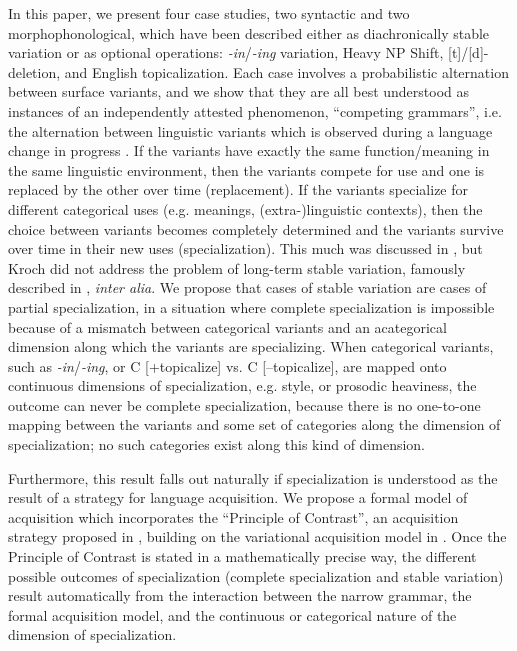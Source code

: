\documentclass[a4paper,aps,prl,12pt,tightenlines,superscriptaddress]{revtex4}
\begin{document}
In this paper, we present four case studies, two syntactic and two morphophonological, which have been described either as diachronically stable variation or as optional operations: \textsl{-in}/\textsl{-ing} variation, Heavy NP Shift, [t]/[d]-deletion, and English topicalization.
Each case involves a probabilistic alternation between surface variants, and we show that they are all best understood as instances of an independently attested phenomenon, ``competing grammars'', i.e. the alternation between linguistic variants which is observed during a language change in progress \citep[][]{kroch1989}.
If the variants have exactly the same function/meaning in the same linguistic environment, then the variants compete for use and one is replaced by the other over time (replacement). 
If the variants specialize for different categorical uses (e.g. meanings, (extra-)linguistic  contexts), then the choice between variants becomes completely determined and the variants survive over time in their new uses (specialization). 
This much was discussed in \citet{kroch1994}, but Kroch did not address the problem of long-term stable variation, famously described in \citet{labov1989}, \textsl{inter alia}. 
We propose that cases of stable variation are cases of partial specialization, in a situation where complete specialization is impossible because of a mismatch between categorical variants and an acategorical dimension along which the variants are specializing.
When categorical variants, such as \textsl{-in}/\textsl{-ing}, or C [+topicalize] vs. C [--topicalize], are mapped onto continuous dimensions of specialization, e.g. style, or prosodic heaviness, the outcome can never be complete specialization, because there is no one-to-one mapping between the variants and some set of categories along the dimension of specialization; no such categories exist along this kind of dimension.
 
Furthermore, this result falls out naturally if specialization is understood as the result of a strategy for language acquisition. 
We propose a formal model of acquisition which incorporates the ``Principle of Contrast'', an acquisition strategy proposed in \citet{clark1987, clark1990}, building on the variational acquisition model in \citet{yang2000}.
Once the Principle of Contrast is stated in a mathematically precise way, the different possible outcomes of specialization (complete specialization and stable variation) result automatically from the interaction between the narrow grammar, the formal acquisition model, and the continuous or categorical nature of the dimension of specialization.



\end{document}
